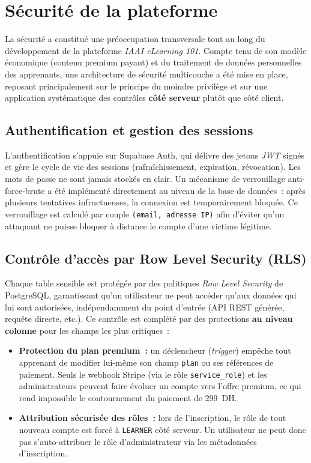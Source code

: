 \documentclass[12pt, a4paper]{report}
\begin{document}
\section{Sécurité de la plateforme}

La sécurité a constitué une préoccupation transversale tout au long du
développement de la plateforme \textit{IAAI eLearning 101}. Compte tenu de son
modèle économique (contenu premium payant) et du traitement de données
personnelles des apprenants, une architecture de sécurité multicouche a été
mise en place, reposant principalement sur le principe du moindre privilège et
sur une application systématique des contrôles \textbf{côté serveur} plutôt que
côté client.

\subsection{Authentification et gestion des sessions}

L'authentification s'appuie sur Supabase Auth, qui délivre des jetons
\textit{JWT} signés et gère le cycle de vie des sessions (rafraîchissement,
expiration, révocation). Les mots de passe ne sont jamais stockés en clair.
Un mécanisme de verrouillage anti-force-brute a été implémenté directement au
niveau de la base de données~: après plusieurs tentatives infructueuses, la
connexion est temporairement bloquée. Ce verrouillage est calculé par couple
\texttt{(email, adresse IP)} afin d'éviter qu'un attaquant ne puisse bloquer à
distance le compte d'une victime légitime.

\subsection{Contrôle d'accès par Row Level Security (RLS)}

Chaque table sensible est protégée par des politiques \textit{Row Level
Security} de PostgreSQL, garantissant qu'un utilisateur ne peut accéder qu'aux
données qui lui sont autorisées, indépendamment du point d'entrée (API REST
générée, requête directe, etc.). Ce contrôle est complété par des protections
\textbf{au niveau colonne} pour les champs les plus critiques~:

\begin{itemize}
    \item \textbf{Protection du plan premium~:} un déclencheur (\textit{trigger})
    empêche tout apprenant de modifier lui-même son champ \texttt{plan} ou ses
    références de paiement. Seuls le webhook Stripe (via le rôle
    \texttt{service\_role}) et les administrateurs peuvent faire évoluer un
    compte vers l'offre premium, ce qui rend impossible le contournement du
    paiement de 299~DH.

    \item \textbf{Attribution sécurisée des rôles~:} lors de l'inscription, le
    rôle de tout nouveau compte est forcé à \texttt{LEARNER} côté serveur. Un
    utilisateur ne peut donc pas s'auto-attribuer le rôle d'administrateur via
    les métadonnées d'inscription.
\end{itemize}
\end{document}
